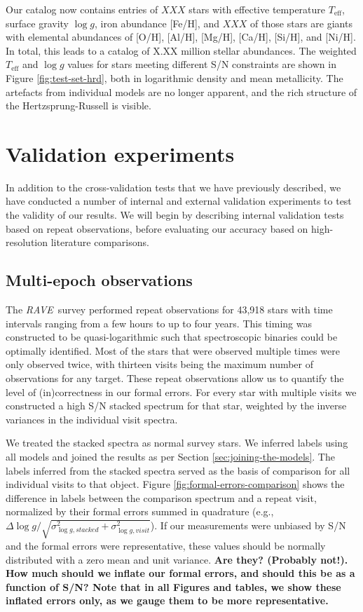 \documentclass[preprint,trackchanges]{aastex}
\newcommand{\acronym}[1]{{\small{#1}}}
\newcommand{\project}[1]{\textsl{#1}}
\newcommand{\rave}{\project{\acronym{RAVE}}}
\newcommand{\stub}[1]{{\color{blue} \textbf{#1}}}
\newcommand{\teff}{T_{\mathrm{eff}}}
\newcommand{\logg}{\log g}
\begin{document}
Our catalog now contains entries of $XXX$ stars with effective temperature $\teff$,
surface gravity $\logg$, iron abundance [Fe/H], and $XXX$ of those stars are giants
with elemental abundances of [O/H], [Al/H], [Mg/H], [Ca/H], [Si/H], and [Ni/H].
In total, this leads to a catalog of X.XX million stellar abundances. 
The weighted $\teff$ and $\logg$ values for stars meeting different
S/N constraints are shown in Figure \ref{fig:test-set-hrd}, both in logarithmic density
and mean metallicity.  The artefacts from individual models are no longer 
apparent, and the rich structure of the Hertzsprung-Russell is visible.


\section{Validation experiments}
\label{sec:validation}


In addition to the cross-validation tests that we have previously described, 
we have conducted a number of internal and external validation experiments to 
test the validity of our results.  We will begin by describing internal validation
tests based on repeat observations, before evaluating our accuracy based on
high-resolution literature comparisons.


\subsection{Multi-epoch observations}
\label{sec:repeat-observations}

The \rave\ survey performed repeat observations for 43,918 stars with time 
intervals ranging from a few hours to up to four years.  This timing was 
constructed to be quasi-logarithmic such that spectroscopic binaries could
be optimally identified. Most of the stars that were observed multiple times
were only observed twice, with thirteen visits being the maximum number 
of observations for any target.  These repeat observations allow us to 
quantify the level of (in)correctness in our formal errors.  For every star
with multiple visits we constructed a high S/N stacked spectrum for that
star, weighted by the inverse variances in the individual visit spectra.


We treated the stacked spectra as normal survey stars.  We inferred labels
using all models and joined the results as per Section \ref{sec:joining-the-models}.  The labels inferred from the stacked spectra served as the basis
of comparison for all individual visits to that object.  Figure 
\ref{fig:formal-errors-comparison} shows the difference in labels 
between the comparison spectrum and a repeat visit, normalized by their 
formal errors summed in quadrature (e.g., 
$\Delta\logg/\sqrt{\sigma_{\logg,stacked}^2 + \sigma_{\logg,visit}^2}$).
If our measurements were unbiased by S/N and the formal errors were 
representative, these values should be normally distributed with a zero 
mean and unit variance.
\stub{Are they? (Probably not!). How much should we inflate our formal errors, and should this be as a function of S/N? Note that in all Figures and tables,
we show these inflated errors only, as we gauge them to be more representative.}
\end{document}
